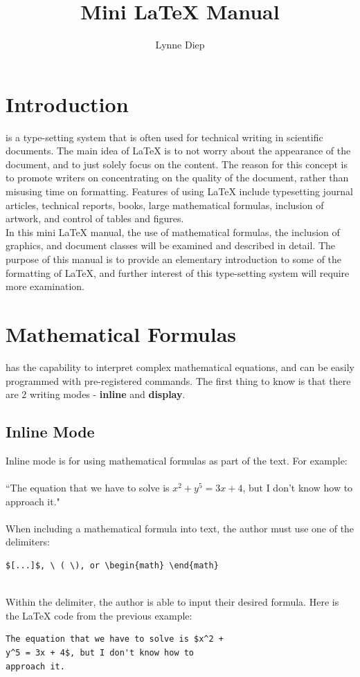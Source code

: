 \documentclass[11pt,twocolumn]{article}
\title{Mini {\LaTeX} Manual}
\author{Lynne Diep}
\begin{document}
\maketitle

\section{Introduction}
\indent 
{\indent{\LaTeX}} is a type-setting system that is often used for technical writing in scientific documents. The main idea of {\LaTeX} is to not worry about the appearance of the document, and to just solely focus on the content. The reason for this concept is to promote writers on concentrating on the quality of the document, rather than misusing time on formatting. Features of using {\LaTeX} include typesetting journal articles, technical reports, books, large mathematical formulas, inclusion of artwork, and control of tables and figures.
\\ 
\indent In this mini {\LaTeX} manual, the use of mathematical formulas, the inclusion of graphics, and document classes will be examined and described in detail. The purpose of this manual is to provide an elementary introduction to some of the formatting of {\LaTeX}, and further interest of this type-setting system will require more examination.

\section {Mathematical Formulas}
\indent
\indent {\LaTeX} has the capability to interpret complex mathematical equations, and can be easily programmed with pre-registered commands. The first thing to know is that there are 2 writing modes - {\bf{inline}} and {\bf{display}}.

\subsection{Inline Mode}
\indent 
\indent Inline mode is for using mathematical formulas as part of the text. For example:
\\
\\
``The equation that we have to solve is $x^2 + y^5 = 3x + 4$, but I don't know how to approach it."
\\
\\
When including a mathematical formula into text, the author must use one of the delimiters:
\begin{verbatim}
$[...]$, \ ( \), or \begin{math} \end{math}
\end{verbatim}
\\
Within the delimiter, the author is able to input their desired formula. Here is the {\LaTeX} code from the previous example:
\begin{verbatim}
The equation that we have to solve is $x^2 + 
y^5 = 3x + 4$, but I don't know how to 
approach it.    
\end{verbatim}
\end{document}
